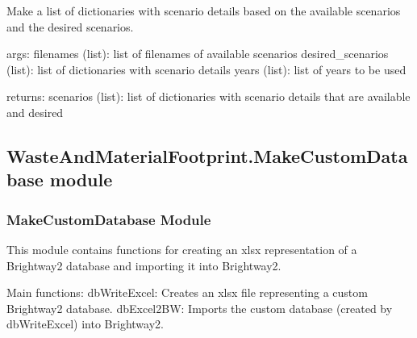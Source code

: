 \documentclass[letterpaper,10pt,english]{sphinxmanual}
\begin{document}
\begin{fulllineitems}
\label{\detokenize{WMFootprint_api:WasteAndMaterialFootprint.FutureScenarios.make_possible_scenario_list}}
\pysigstartsignatures
{}
\pysigstopsignatures
\sphinxAtStartPar
Make a list of dictionaries with scenario details based on the available scenarios and the desired scenarios.

\sphinxAtStartPar
args: filenames (list): list of filenames of available scenarios
desired\_scenarios (list): list of dictionaries with scenario details
years (list): list of years to be used

\sphinxAtStartPar
returns: scenarios (list): list of dictionaries with scenario details that are available and desired

\end{fulllineitems}



\subsection{WasteAndMaterialFootprint.MakeCustomDatabase module}
\label{\detokenize{WMFootprint_api:module-WasteAndMaterialFootprint.MakeCustomDatabase}}\label{\detokenize{WMFootprint_api:wasteandmaterialfootprint-makecustomdatabase-module}}

\subsubsection{MakeCustomDatabase Module}
\label{\detokenize{WMFootprint_api:makecustomdatabase-module}}
\sphinxAtStartPar
This module contains functions for creating an xlsx representation of a Brightway2 database 
and importing it into Brightway2.

\sphinxAtStartPar
Main functions:
\sphinxhyphen{} dbWriteExcel: Creates an xlsx file representing a custom Brightway2 database.
\sphinxhyphen{} dbExcel2BW: Imports the custom database (created by dbWriteExcel) into Brightway2.
\end{document}
